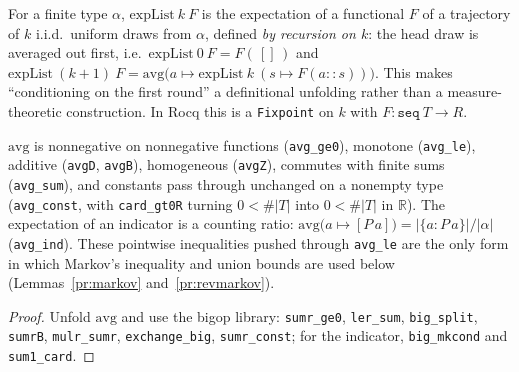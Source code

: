 \begin{definition}\label{pr:expList}
  \rocqok
  For a finite type $\alpha$, $\mathrm{expList}\ k\ F$ is the
  expectation of a functional $F$ of a trajectory of $k$ i.i.d.\ uniform
  draws from $\alpha$, defined \emph{by recursion on $k$}: the head draw is
  averaged out first, i.e.\ $\mathrm{expList}\ 0\ F = F(\,[]\,)$ and
  $\mathrm{expList}\ (k{+}1)\ F
    = \mathrm{avg}\bigl(a \mapsto \mathrm{expList}\ k\ (s \mapsto
    F(a :: s))\bigr)$.
  This makes ``conditioning on the first round'' a definitional unfolding
  rather than a measure-theoretic construction. In Rocq this is a
  \texttt{Fixpoint} on $k$ with $F \colon \texttt{seq}\ T \to R$.
\end{definition}

\begin{lemma}\label{pr:avg-basic}
  \rocqok
  $\mathrm{avg}$ is nonnegative on nonnegative functions
  (\texttt{avg\_ge0}), monotone (\texttt{avg\_le}), additive
  (\texttt{avgD}, \texttt{avgB}), homogeneous (\texttt{avgZ}), commutes with
  finite sums (\texttt{avg\_sum}), and constants pass through unchanged on a
  nonempty type (\texttt{avg\_const}, with \texttt{card\_gt0R} turning
  $0 < \#|T|$ into $0 < \#|T|$ in $\mathbb{R}$). The expectation of an
  indicator is a counting ratio:
  $\mathrm{avg}\bigl(a \mapsto [P\,a]\bigr) = |\{a : P\,a\}| / |\alpha|$
  (\texttt{avg\_ind}). These pointwise inequalities pushed through
  \texttt{avg\_le} are the only form in which Markov's inequality and union
  bounds are used below (Lemmas~\ref{pr:markov} and~\ref{pr:revmarkov}).
\end{lemma}
\begin{proof}
  \rocqok
  Unfold $\mathrm{avg}$ and use the bigop library: \texttt{sumr\_ge0},
  \texttt{ler\_sum}, \texttt{big\_split}, \texttt{sumrB},
  \texttt{mulr\_sumr}, \texttt{exchange\_big}, \texttt{sumr\_const}; for the
  indicator, \texttt{big\_mkcond} and \texttt{sum1\_card}.
\end{proof}

